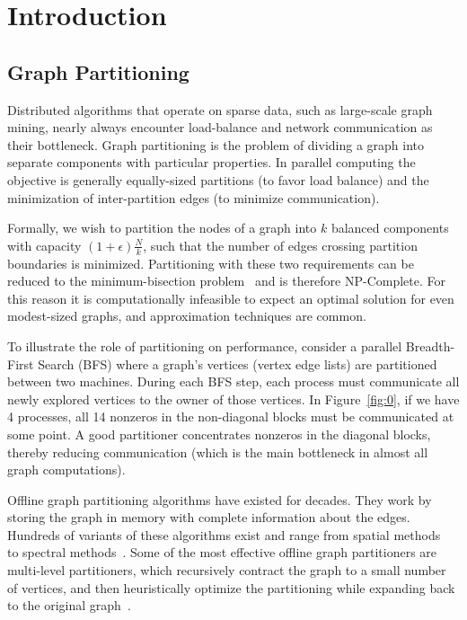 \section{Introduction}
\subsection{Graph Partitioning}
Distributed algorithms that operate on sparse data, such as large-scale graph mining, nearly always encounter load-balance and network communication as their bottleneck. Graph partitioning is the problem of dividing a graph into separate components with particular properties. In parallel computing the objective is generally equally-sized partitions (to favor load balance) and the minimization of inter-partition edges (to minimize communication).

Formally, we wish to partition the nodes of a graph into $k$ balanced components with capacity $(1+\epsilon)\frac{N}{k}$, such that the number of edges crossing partition boundaries is minimized. Partitioning with these two requirements can be reduced to the minimum-bisection problem~\cite{Garey:1979:CIG:578533} and is therefore NP-Complete. For this reason it is computationally infeasible to expect an optimal solution for even modest-sized graphs, and approximation techniques are common.

To illustrate the role of partitioning on performance, consider a parallel Breadth-First Search (BFS) where a graph's vertices (vertex edge lists) are partitioned between two machines. During each BFS step, each process must communicate all newly explored vertices to the owner of those vertices.
In Figure~\ref{fig:0}, if we have 4 processes, all 14 nonzeros in the non-diagonal blocks must be communicated at some point.
A good partitioner concentrates nonzeros in the diagonal blocks, thereby reducing communication (which is the main bottleneck in almost all graph computations).

Offline graph partitioning algorithms have existed for decades.
They work by storing the graph in memory with complete information about the edges.
Hundreds of variants of these algorithms exist and range from spatial methods~\cite{Gilbert95geometricmesh} to spectral methods~\cite{arora2009expander}.
Some of the most effective offline graph partitioners are multi-level partitioners, which recursively contract the graph to a small number of vertices, and then heuristically optimize the partitioning while expanding back to the original graph~\cite{karypis1998multilevel}.

